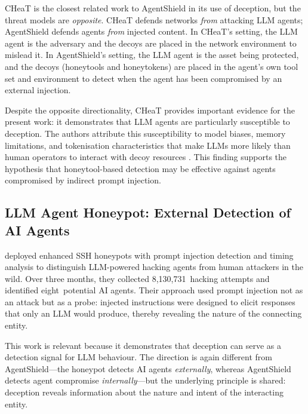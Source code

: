 \begin{justify}
CHeaT is the closest related work to AgentShield in its use of deception, but the threat models are \emph{opposite}.  CHeaT defends networks \emph{from} attacking LLM agents; AgentShield defends agents \emph{from} injected content.  In CHeaT's setting, the LLM agent is the adversary and the decoys are placed in the network environment to mislead it.  In AgentShield's setting, the LLM agent is the asset being protected, and the decoys (honeytools and honeytokens) are placed in the agent's own tool set and environment to detect when the agent has been compromised by an external injection.
\end{justify}

\begin{justify}
Despite the opposite directionality, CHeaT provides important evidence for the present work: it demonstrates that LLM agents are particularly susceptible to deception.  The authors attribute this susceptibility to model biases, memory limitations, and tokenisation characteristics that make LLMs more likely than human operators to interact with decoy resources \citep{ayzenshteyn2025cloak}.  This finding supports the hypothesis that honeytool-based detection may be effective against agents compromised by indirect prompt injection.
\end{justify}

\subsection{LLM Agent Honeypot: External Detection of AI Agents}

\begin{justify}
\cite{reworr2024llm} deployed enhanced SSH honeypots with prompt injection detection and timing analysis to distinguish LLM-powered hacking agents from human attackers in the wild.  Over three months, they collected 8,130,731~hacking attempts and identified eight~potential AI agents.  Their approach used prompt injection not as an attack but as a probe: injected instructions were designed to elicit responses that only an LLM would produce, thereby revealing the nature of the connecting entity.
\end{justify}

\begin{justify}
This work is relevant because it demonstrates that deception can serve as a detection signal for LLM behaviour.  The direction is again different from AgentShield---the honeypot detects AI agents \emph{externally}, whereas AgentShield detects agent compromise \emph{internally}---but the underlying principle is shared: deception reveals information about the nature and intent of the interacting entity.
\end{justify}


